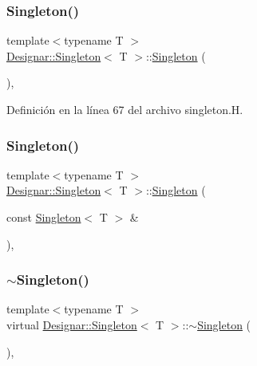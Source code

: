 \subsubsection{\texorpdfstring{Singleton()}{Singleton()}\hspace{0.1cm}{\footnotesize\ttfamily [1/2]}}
{\footnotesize\ttfamily template$<$typename T $>$ \\
\hyperlink{class_designar_1_1_singleton}{Designar\+::\+Singleton}$<$ T $>$\+::\hyperlink{class_designar_1_1_singleton}{Singleton} (\begin{DoxyParamCaption}{ }\end{DoxyParamCaption})\hspace{0.3cm}{\ttfamily [inline]}, {\ttfamily [protected]}}



Definición en la línea 67 del archivo singleton.\+H.

\mbox{\label{class_designar_1_1_singleton_a961a62f81db43d2b610949a76f9645f2}} 
\subsubsection{\texorpdfstring{Singleton()}{Singleton()}\hspace{0.1cm}{\footnotesize\ttfamily [2/2]}}
{\footnotesize\ttfamily template$<$typename T $>$ \\
\hyperlink{class_designar_1_1_singleton}{Designar\+::\+Singleton}$<$ T $>$\+::\hyperlink{class_designar_1_1_singleton}{Singleton} (\begin{DoxyParamCaption}\item[{const \hyperlink{class_designar_1_1_singleton}{Singleton}$<$ T $>$ \&}]{ }\end{DoxyParamCaption})\hspace{0.3cm}{\ttfamily [protected]}, {\ttfamily [delete]}}

\mbox{\label{class_designar_1_1_singleton_abf7976824a492dd42ed608bcafb8d98d}} 
\subsubsection{\texorpdfstring{$\sim$\+Singleton()}{~Singleton()}}
{\footnotesize\ttfamily template$<$typename T $>$ \\
virtual \hyperlink{class_designar_1_1_singleton}{Designar\+::\+Singleton}$<$ T $>$\+::$\sim$\hyperlink{class_designar_1_1_singleton}{Singleton} (\begin{DoxyParamCaption}{ }\end{DoxyParamCaption})\hspace{0.3cm}{\ttfamily [inline]}, {\ttfamily [virtual]}}



